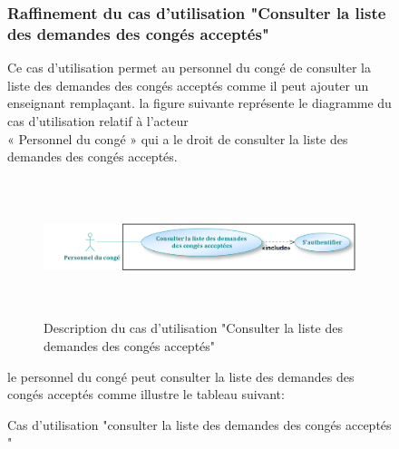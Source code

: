 \documentclass[12 pt]{report}
\begin{document}
\begin{figure}[h]
\begin{center}
\subsubsection{Raffinement du cas d'utilisation "Consulter la liste des demandes des congés acceptés"}
Ce cas d'utilisation permet au personnel du congé de consulter la liste des demandes des congés acceptés comme il peut ajouter un enseignant remplaçant.
\newpage
la figure suivante représente le diagramme du cas d’utilisation  relatif à l’acteur \\« Personnel du congé » qui a le droit de consulter la liste des demandes des congés acceptés.

\begin{figure}[h]
\begin{center}
\includegraphics[width= 13cm , height = 4cm]{seq_consulte_acce.png}
\caption{Description du cas d'utilisation "Consulter la liste des demandes des congés acceptés"}
\end{center}
\end{figure}

le personnel du congé peut consulter la liste des demandes des congés acceptés  comme illustre le tableau suivant:
\begin{table}[htbp]
\begin{center}
\caption{Cas d'utilisation "consulter la liste des demandes des congés acceptés "}
 

\end{center}
\end{table}
\end{center}
\end{figure}
\end{document}

